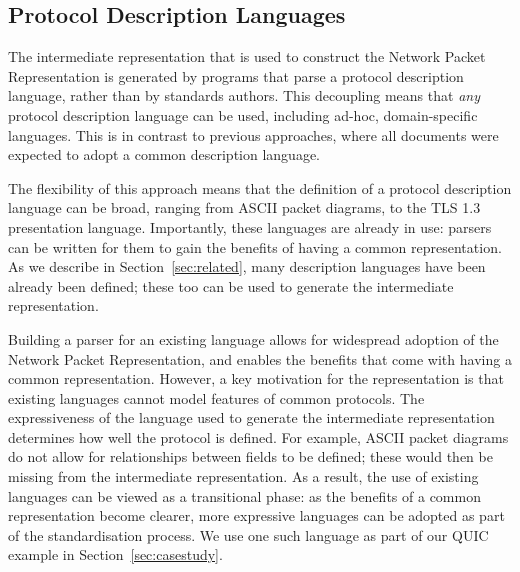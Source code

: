 \documentclass[10pt,sigconf]{acmart}
\begin{document}


\subsection{Protocol Description Languages}
\label{sec:npr-input}

The intermediate representation that is used to construct the Network Packet
Representation is generated by programs that parse a protocol description language, rather
than by standards authors. This decoupling means that \emph{any} protocol description
language can be used, including ad-hoc, domain-specific languages. This is in contrast to
previous approaches, where all documents were expected to adopt a common description
language.

The flexibility of this approach means that the definition of a protocol description
language can be broad, ranging from ASCII packet diagrams, to the TLS 1.3 presentation
language. Importantly, these languages are already in use: parsers can be written for them
to gain the benefits of having a common representation. As we describe in
Section~\ref{sec:related}, many description languages have been already been defined;
these too can be used to generate the intermediate representation.

Building a parser for an existing language allows for widespread adoption of the Network
Packet Representation, and enables the benefits that come with having a common
representation. However, a key motivation for the representation is that existing
languages cannot model features of common protocols. The expressiveness of the language
used to generate the intermediate representation determines how well the protocol is
defined. For example, ASCII packet diagrams do not allow for relationships between fields
to be defined; these would then be missing from the intermediate representation. As a
result, the use of existing languages can be viewed as a transitional phase: as the
benefits of a common representation become clearer, more expressive languages can be
adopted as part of the standardisation process. We use one such language as part of our
QUIC example in Section~\ref{sec:casestudy}.
\end{document}
